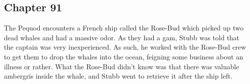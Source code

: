 \subsection{Chapter 91}

The Pequod encounters a French ship called the Rose-Bud which picked up two
dead whales and had a massive odor. As they had a gam, Stubb was told that the
captain was very inexperienced. As such, he worked with the Rose-Bud crew to
get them to drop the whales into the ocean, feigning some business about an
illness or rather. What the Rose-Bud didn't know was that there was valuable
ambergris inside the whale, and Stubb went to retrieve it after the ship left.
